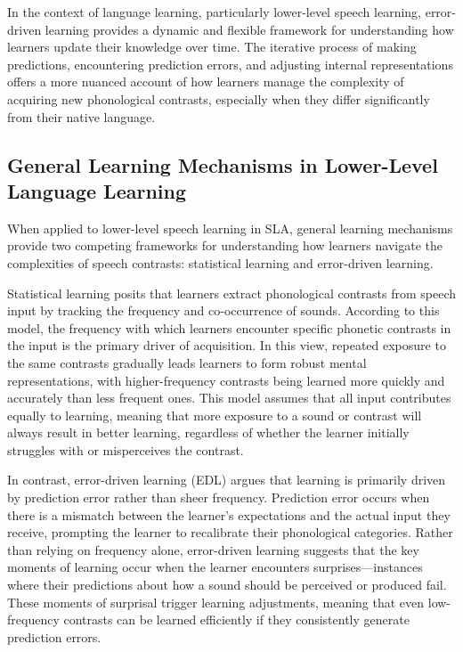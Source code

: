 In the context of language learning, particularly lower-level speech learning, error-driven learning provides a dynamic and flexible framework for understanding how learners update their knowledge over time. The iterative process of making predictions, encountering prediction errors, and adjusting internal representations offers a more nuanced account of how learners manage the complexity of acquiring new phonological contrasts, especially when they differ significantly from their native language.

\subsection{General Learning Mechanisms in Lower-Level Language Learning}

When applied to lower-level speech learning in SLA, general learning mechanisms provide two competing frameworks for understanding how learners navigate the complexities of speech contrasts: statistical learning and error-driven learning.

Statistical learning posits that learners extract phonological contrasts from speech input by tracking the frequency and co-occurrence of sounds. According to this model, the frequency with which learners encounter specific phonetic contrasts in the input is the primary driver of acquisition. In this view, repeated exposure to the same contrasts gradually leads learners to form robust mental representations, with higher-frequency contrasts being learned more quickly and accurately than less frequent ones. This model assumes that all input contributes equally to learning, meaning that more exposure to a sound or contrast will always result in better learning, regardless of whether the learner initially struggles with or misperceives the contrast.

In contrast, error-driven learning (EDL) argues that learning is primarily driven by prediction error rather than sheer frequency. Prediction error occurs when there is a mismatch between the learner's expectations and the actual input they receive, prompting the learner to recalibrate their phonological categories. Rather than relying on frequency alone, error-driven learning suggests that the key moments of learning occur when the learner encounters surprises—instances where their predictions about how a sound should be perceived or produced fail. These moments of surprisal trigger learning adjustments, meaning that even low-frequency contrasts can be learned efficiently if they consistently generate prediction errors.

